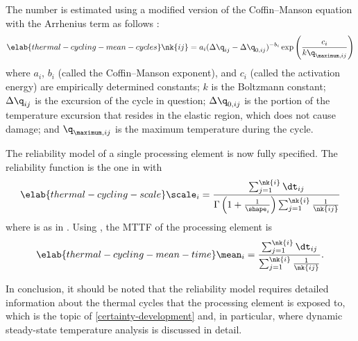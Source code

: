 The number  is estimated using a modified version of the Coffin--Manson
equation with the Arrhenius term as follows \cite{xiang2010, jedec2016}:
\begin{equation} \elab{thermal-cycling-mean-cycles}
  \nk{ij} = a_i (\Delta \q_{ij} - \Delta \q_{0, ij})^{-b_i} \exp\left(\frac{c_i}{k \q_{\maximum, ij}}\right)
\end{equation}
where $a_i$, $b_i$ (called the Coffin--Manson exponent), and $c_i$ (called the
activation energy) are empirically determined constants; $k$ is the Boltzmann
constant; $\Delta \q_{ij}$ is the excursion of the cycle in question; $\Delta
\q_{0, ij}$ is the portion of the temperature excursion that resides in the
elastic region, which does not cause damage; and $\q_{\maximum, ij}$ is the
maximum temperature during the cycle.

The reliability model of a single processing element is now fully specified. The
reliability function is the one in  with
\begin{equation} \elab{thermal-cycling-scale}
  \scale_i = \frac{\sum_{j = 1}^{\nk{i}} \dt_{ij}}{\Gamma\left(1 + \frac{1}{\shape_i}\right) \sum_{j = 1}^{\nk{i}} \frac{1}{\nk{ij}}}
\end{equation}
where  is as in . Using
, the \ac{MTTF} of the processing element is
\begin{equation} \elab{thermal-cycling-mean-time}
  \mean_i = \frac{\sum_{j = 1}^{\nk{i}} \dt_{ij}}{\sum_{j = 1}^{\nk{i}} \frac{1}{\nk{ij}}}.
\end{equation}

In conclusion, it should be noted that the reliability model requires detailed
information about the thermal cycles that the processing element is exposed to,
which is the topic of \cref{certainty-development} and, in particular,
 where dynamic steady-state temperature
analysis is discussed in detail.
